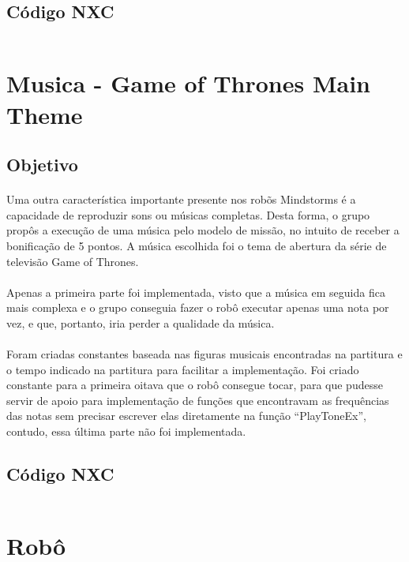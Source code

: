 \documentclass[12pt,a4paper]{article}
\begin{document}
	\subsection{Código NXC}
		\inputminted[linenos, frame = single]{c}{../ZonaDeSeguranca.nxc}

\newpage
\section{Musica - Game of Thrones Main Theme}
	\subsection{Objetivo}
		\paragraph{}
			Uma outra característica importante presente nos robõs Mindstorms é 
			a capacidade de reproduzir sons ou músicas completas. Desta forma, o 
			grupo propôs a execução de uma música pelo modelo de missão, no 
			intuito de receber a bonificação de 5 pontos. A música escolhida foi
			o tema de abertura da série de televisão Game of Thrones.
		\paragraph{}
			Apenas a primeira parte foi implementada, visto que a música em 
			seguida fica mais complexa e o grupo conseguia fazer o robô executar 
			apenas uma nota por vez, e que, portanto, iria perder a qualidade 
			da música.
		\paragraph{}
			Foram criadas constantes baseada nas figuras musicais encontradas na 
			partitura e o tempo indicado na partitura para facilitar a 
			implementação. Foi criado constante para a primeira oitava que o 
			robô consegue tocar, para que pudesse servir de apoio para 
			implementação de funções que encontravam as frequências das notas 
			sem precisar escrever elas diretamente na função “PlayToneEx”, 
			contudo, essa última parte não foi implementada.

	\subsection{Código NXC}
		\inputminted[linenos, frame = single]{c}{../GameOfThrones.nxc}

\newpage
\section{Robô}
\end{document}
